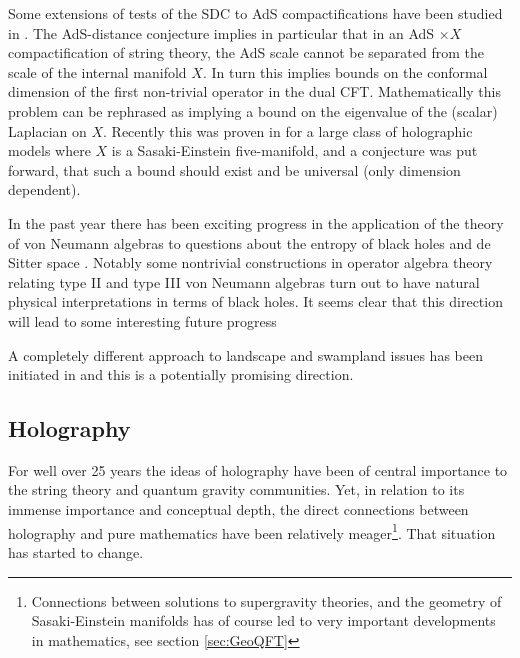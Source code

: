 \documentclass[12pt]{article}
\begin{document}
Some extensions of tests of the SDC to AdS compactifications 
have been studied in \cite{Lust:2019zwm, Perlmutter:2020buo}. The AdS-distance conjecture implies in particular that in an 
AdS $\times X$ compactification of string theory, the 
AdS scale cannot be separated from the scale of the internal manifold $X$. 
In turn this implies bounds on the conformal dimension of the first non-trivial operator in the dual CFT. 
Mathematically this problem can be rephrased as implying a bound on the eigenvalue of the (scalar) Laplacian on $X$. Recently this was proven in
\cite{Collins:2022nux} for a large class of holographic models where $X$ is a  Sasaki-Einstein five-manifold, and a conjecture was put forward, that such a bound should exist and be universal (only dimension dependent). 

In the past year there has been exciting progress in the application of the theory of von Neumann algebras to questions about the entropy of black holes and de Sitter space
\cite{Leutheusser:2021qhd,Leutheusser:2021frk,Witten:2021jzq,Witten:2021unn,Longo:2022lod,Chandrasekaran:2022cip,Chandrasekaran:2022eqq}. Notably some nontrivial constructions in operator algebra theory relating type II and type III von Neumann algebras turn out to have natural physical interpretations in terms of black holes. It seems clear that this direction will lead to some interesting future progress 




A completely different approach to landscape and swampland issues
has been initiated in \cite{Freedman:2020isd,Freedman:2021skw} and
this is a potentially promising direction.
 


\subsection{Holography}

For well over 25 years the ideas of holography have been 
of central importance to the string theory and quantum gravity 
communities. Yet, in relation to its immense importance and conceptual 
depth, the direct connections between holography and pure mathematics have been 
relatively meager\footnote{Connections between solutions to supergravity theories, and the geometry of Sasaki-Einstein manifolds has of course led to very important developments in mathematics, see section \ref{sec:GeoQFT}}. That situation has started to change. 
\end{document}

